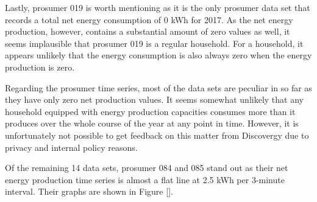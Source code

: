 Lastly, prosumer 019 is worth mentioning as it is the only prosumer data set that records a total net energy consumption of 0 kWh for 2017. As the net energy production, however, contains a substantial amount of zero values as well, it seems implausible that prosumer 019 is a regular household. For a household, it appears unlikely that the energy consumption is also always zero when the energy production is zero.

Regarding the prosumer time series, most of the data sets are peculiar in so far as they have only zero net production values. It seems somewhat unlikely that any household equipped with energy production capacities  consumes more than it produces over the whole course of the year at any point in time. However, it is unfortunately not possible to get feedback on this matter from Discovergy due to privacy and internal policy reasons.

Of the remaining 14 data sets, prosumer 084 and 085 stand out as their net energy production time series is almost a flat line at 2.5 kWh per 3-minute interval. Their graphs are shown in Figure \ref{}.

